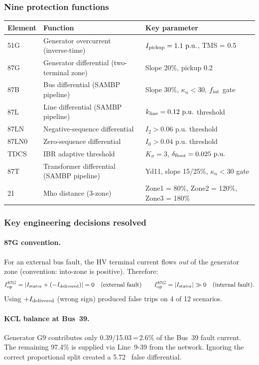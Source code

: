 \documentclass[12pt,a4paper]{article}
\newcommand{\kn}{\kappa_n}
\newcommand{\pu}{\,\text{p.u.}}
\begin{document}
\subsubsection{Nine protection functions}
\begin{center}
\begin{tabular}{lll}
\toprule
Element & Function & Key parameter \\
\midrule
51G  & Generator overcurrent (inverse-time) & $I_{\rm pickup} = 1.1\,\pu$, TMS = 0.5 \\
87G  & Generator differential (two-terminal zone) & Slope 20\%, pickup 0.2\,\pu \\
87B  & Bus differential (SAMBP pipeline) & Slope 30\%, $\kn < 30$, $f_{\rm int}$ gate \\
87L  & Line differential (SAMBP pipeline) & $k_{\rm line} = 0.12\,\pu$ threshold \\
87LN & Negative-sequence differential & $I_2 > 0.06\,\pu$ threshold \\
87LN0& Zero-sequence differential & $I_0 > 0.04\,\pu$ threshold \\
TDCS & IBR adaptive threshold & $K_\sigma = 3$, $\delta_{\rm floor} = 0.025\,\pu$ \\
87T  & Transformer differential (SAMBP pipeline) & Yd11, slope 15/25\%, $\kn < 30$ gate \\
21   & Mho distance (3-zone) & Zone1 = 80\%, Zone2 = 120\%, Zone3 = 180\% \\
\bottomrule
\end{tabular}
\end{center}

\subsubsection{Key engineering decisions resolved}

\paragraph{87G convention.}
For an external bus fault, the HV terminal current flows \emph{out} of the
generator zone (convention: into-zone is positive).  Therefore:
\[
  I_{\rm op}^{87G} = |I_{\rm stator} + (-I_{\rm delivered})| = 0
  \quad\text{(external fault)} \qquad
  I_{\rm op}^{87G} = |I_{\rm stator}| \gg 0
  \quad\text{(internal fault)}.
\]
Using $+I_{\rm delivered}$ (wrong sign) produced false trips on 4 of 12 scenarios.

\paragraph{KCL balance at Bus~39.}
Generator G9 contributes only 0.39/15.03\,=\,2.6\% of the Bus~39 fault current.
The remaining 97.4\% is supplied via Line~9-39 from the network.
Ignoring the correct proportional split created a 5.72\,\pu\ false differential.
\end{document}
